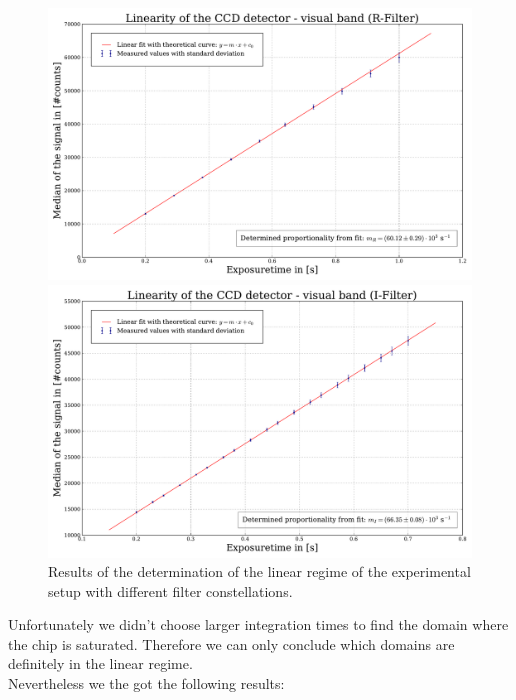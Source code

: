 \begin{figure}[H]
	\begin{minipage}{0.4\textwidth}
		\includegraphics[scale = 0.2]{figures/Plots/linearityR}
	\end{minipage}
	\begin{minipage}{0.4\textwidth}
	\hspace{1.7cm}
		\includegraphics[scale=0.2]{figures/Plots/linearityI}
	\end{minipage}
	\caption{Results of the determination of the linear regime of the experimental setup with different filter constellations.}
\end{figure} 
Unfortunately we didn't choose larger integration times to find the domain where the chip is saturated. Therefore we can only conclude which domains are definitely in the linear regime.\\
Nevertheless we the got the following results:
